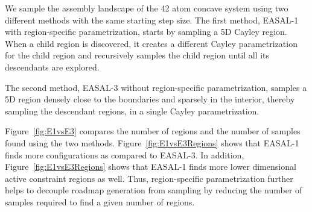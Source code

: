 \documentclass[]{article}
\newcommand{\figref}[1]{Figure~\ref{#1}}
\newcommand{\rmc}{rigid molecular component}
\begin{document}
We sample the assembly landscape of the 42 atom concave system using two
different methods with the same starting step size. The first method, EASAL-1
with region-specific parametrization, starts by sampling a 5D Cayley region.
When a child region is discovered, it creates a different Cayley
parametrization for the child region and recursively samples the child region
until all its descendants are explored.
\begin{figure*}[htpb]

\caption{\scriptsize \textbf{Bar-Codes for Approximate Basin Volumes:}
Volumes of potential
energy basins in the assembly landscape of the 6 input \rmc\ pairs described in
Section \ref{sec:expSetup}.
The bottom most portion of the paraboloid shows the volume of all the 0D regions
and each successive layer shows the volume of regions 1 dimension higher. 
Higher volumes are shown
in red and lower volumes are shown in blue (see scale beside each figure). 
See text in Section \ref{sec:results:approximateVolume}.}
\label{fig:BasinVolume}
\end{figure*}
The second method, EASAL-3 without region-specific parametrization, samples a
5D region densely close to the boundaries and sparsely in the interior, thereby
sampling the descendant regions, in a single Cayley parametrization.

\figref{fig:E1vsE3} compares the number of regions and the number of samples
found using the two methods. \figref{fig:E1vsE3Regions} shows that EASAL-1
finds more configurations as compared to EASAL-3. In addition,
\figref{fig:E1vsE3Regions} shows that EASAL-1 finds more lower dimensional
active constraint regions as well. Thus, region-specific parametrization
further helps to decouple roadmap generation from sampling by reducing the number of samples
required to find a given number of regions.
\end{document}
